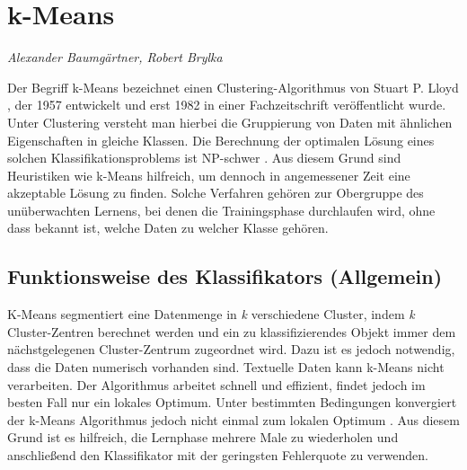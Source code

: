 \section{k-Means}
\textit{Alexander Baumgärtner, Robert Brylka}

Der Begriff k-Means bezeichnet einen Clustering-Algorithmus von Stuart P. Lloyd \cite{Lloyd}, der 1957 entwickelt und erst 1982 in einer Fachzeitschrift veröffentlicht wurde. Unter Clustering versteht man hierbei die Gruppierung von Daten mit ähnlichen Eigenschaften in gleiche Klassen. Die Berechnung der optimalen Lösung eines solchen Klassifikationsproblems ist NP-schwer \cite{kMeansNPhard}. Aus diesem Grund sind Heuristiken wie k-Means hilfreich, um dennoch in angemessener Zeit eine akzeptable Lösung zu finden.
Solche Verfahren gehören zur Obergruppe des unüberwachten Lernens, bei denen die Trainingsphase durchlaufen wird, ohne dass 
bekannt ist, welche Daten zu welcher Klasse gehören.



\subsection{Funktionsweise des Klassifikators (Allgemein)} \label{subsec:kMeansFunktionsweise}
K-Means segmentiert eine Datenmenge in \emph{k} verschiedene Cluster, indem \emph{k} Cluster-Zentren berechnet werden und ein zu klassifizierendes Objekt immer dem nächstgelegenen Cluster-Zentrum zugeordnet wird. Dazu ist es jedoch notwendig, dass die Daten numerisch vorhanden sind. Textuelle Daten kann k-Means nicht verarbeiten.
Der Algorithmus arbeitet schnell und effizient, findet jedoch im besten Fall nur ein lokales Optimum. Unter bestimmten Bedingungen konvergiert der k-Means Algorithmus jedoch nicht einmal zum lokalen Optimum \cite{kMeansMinimum}. Aus diesem Grund ist es hilfreich, die Lernphase mehrere Male zu wiederholen und anschließend den Klassifikator mit der geringsten Fehlerquote zu verwenden.  

